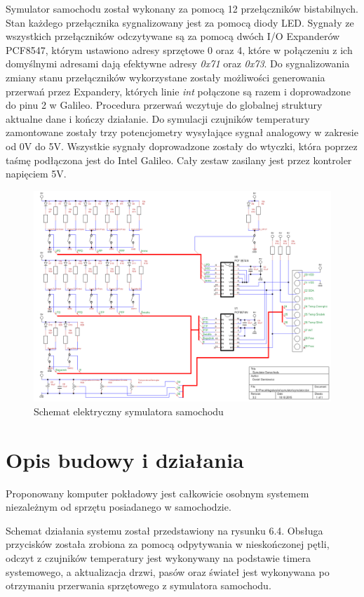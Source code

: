 \documentclass{xmgr}
\begin{document}
Symulator samochodu został wykonany za pomocą 12 przełączników bistabilnych. Stan każdego przełącznika sygnalizowany jest za pomocą diody LED. Sygnały ze wszystkich przełączników odczytywane są za pomocą dwóch I/O Expanderów PCF8547, którym ustawiono adresy sprzętowe 0 oraz 4, które w połączeniu z ich domyślnymi adresami dają efektywne adresy \emph{0x71} oraz \emph{0x73}. Do sygnalizowania zmiany stanu przełączników wykorzystane zostały możliwości generowania przerwań przez Expandery, których linie \emph{int} połączone są razem i doprowadzone do pinu 2 w Galileo. Procedura przerwań wczytuje do globalnej struktury aktualne dane i kończy działanie. Do symulacji czujników temperatury zamontowane zostały trzy potencjometry wysyłające sygnał analogowy w zakresie od 0V do 5V. Wszystkie sygnały doprowadzone zostały do wtyczki, która poprzez taśmę podłączona jest do Intel Galileo. Cały zestaw zasilany jest przez kontroler napięciem 5V.

\begin{figure}[!h]
    \centering
    	\includegraphics[height=0.4\textheight]{images/symulator.png}
    \caption{Schemat elektryczny symulatora samochodu}
\end{figure}

\section{Opis budowy i działania}
Proponowany komputer pokładowy jest całkowicie osobnym systemem niezależnym od sprzętu posiadanego w samochodzie.

Schemat działania systemu został przedstawiony na rysunku 6.4. Obsługa przycisków została zrobiona za pomocą odpytywania w nieskończonej pętli, odczyt z czujników temperatury jest wykonywany na podstawie timera systemowego, a aktualizacja drzwi, pasów oraz świateł jest wykonywana po otrzymaniu przerwania sprzętowego z symulatora samochodu.
\end{document}
